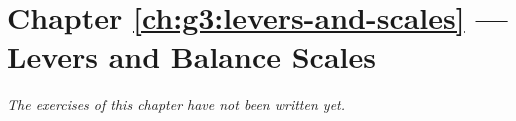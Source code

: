 \section*{Chapter \ref{ch:g3:levers-and-scales} --- Levers and Balance Scales}


\emph{The exercises of this chapter have not been written yet.}
